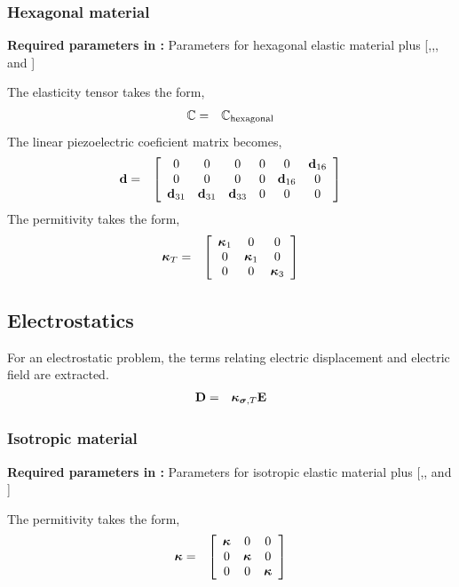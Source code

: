 \subsubsection{Hexagonal material}
\begin{flushleft}
  \textbf{Required parameters in :}
  Parameters for hexagonal elastic material plus [,,, and ]
\end{flushleft}
The elasticity tensor takes the form,
\begin{eqnarray}
\mathbb{C} &=& \mathbb{C}_\text{hexagonal}
\end{eqnarray}
The linear piezoelectric coeficient matrix becomes,
\begin{eqnarray}
\mathbf{d} &=& 
\left[
\begin{array}{cccccc}
0 & 0 & 0 & 0 & 0         & \mathbf{d}_{16} \\
0 & 0 & 0 & 0 & \mathbf{d}_{16} & 0         \\
\mathbf{d}_{31} & \mathbf{d}_{31} & \mathbf{d}_{33} & 0 & 0 & 0         
\end{array}
\right]
\end{eqnarray}
The permitivity takes the form,
\begin{eqnarray}
\boldsymbol{\kappa}_T &=&
\left[
\begin{array}{ccc}
\boldsymbol{\kappa}_1 & 0 & 0 \\
0 & \boldsymbol{\kappa}_1 & 0 \\
0 & 0 & \boldsymbol{\kappa}_3
\end{array}
\right]
\end{eqnarray}


\clearpage
\subsection{Electrostatics }
For an electrostatic problem, the terms relating electric displacement and
electric field are
extracted. 
\begin{eqnarray}
\mathbf{D}
&=&
\boldsymbol{\kappa}_{\boldsymbol{\sigma},T}
\mathbf{E}
\end{eqnarray}

\subsubsection{Isotropic material}
\begin{flushleft}
  \textbf{Required parameters in :}
  Parameters for isotropic elastic material plus [,, and ]
\end{flushleft}
The permitivity takes the form,
\begin{eqnarray}
\boldsymbol{\kappa} &=&
\left[
\begin{array}{ccc}
\boldsymbol{\kappa} & 0 & 0 \\
0 & \boldsymbol{\kappa} & 0 \\
0 & 0 & \boldsymbol{\kappa}
\end{array}
\right]
\end{eqnarray}

